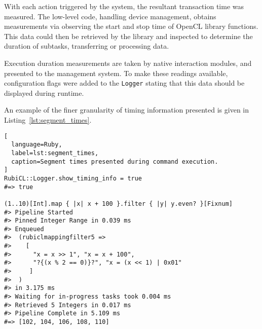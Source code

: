 With each action triggered by the system, the resultant transaction time was measured.
The low-level code, handling device management, obtains measurements via observing the start and stop time of \ac{OpenCL} library functions.
This data could then be retrieved by the library and inspected to determine the duration of subtasks, transferring or processing data.

Execution duration measurements are taken by native interaction modules, and presented to the management system.
To make these readings available, configuration flags were added to the \verb|Logger| stating that this data should be displayed during runtime.

An example of the finer granularity of timing information presented is given in Listing~\ref{lst:segment_times}.
\begin{lstlisting}[
  language=Ruby,
  label=lst:segment_times,
  caption=Segment times presented during command execution.
]
RubiCL::Logger.show_timing_info = true
#=> true

(1..10)[Int].map { |x| x + 100 }.filter { |y| y.even? }[Fixnum]
#> Pipeline Started
#> Pinned Integer Range in 0.039 ms
#> Enqueued
#>  (rubiclmappingfilter5 =>
#>    [
#>      "x = x >> 1", "x = x + 100",
#>      "?{(x % 2 == 0)}?", "x = (x << 1) | 0x01"
#>     ]
#>  )
#> in 3.175 ms
#> Waiting for in-progress tasks took 0.004 ms
#> Retrieved 5 Integers in 0.017 ms
#> Pipeline Complete in 5.109 ms
#=> [102, 104, 106, 108, 110]

\end{lstlisting}

